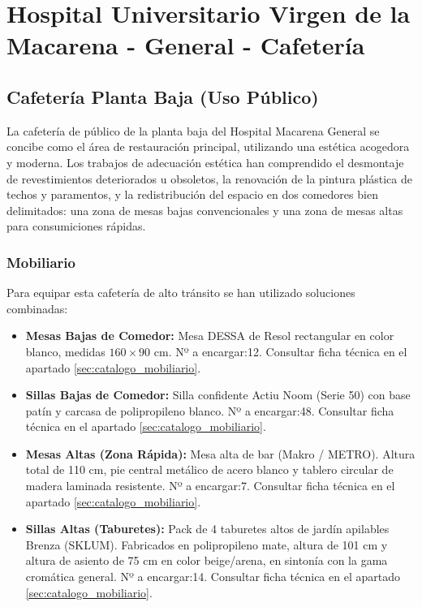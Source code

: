 \documentclass[12pt,a4paper]{article}
\begin{document}
\section{Hospital Universitario Virgen de la Macarena - General - Cafetería}

\subsection{Cafetería Planta Baja (Uso Público)}
La cafetería de público de la planta baja del Hospital Macarena General se concibe como el área de restauración principal, utilizando una estética acogedora y moderna. Los trabajos de adecuación estética han comprendido el desmontaje de revestimientos deteriorados u obsoletos, la renovación de la pintura plástica de techos y paramentos, y la redistribución del espacio en dos comedores bien delimitados: una zona de mesas bajas convencionales y una zona de mesas altas para consumiciones rápidas.

\subsubsection{Mobiliario}
Para equipar esta cafetería de alto tránsito se han utilizado soluciones combinadas:
\begin{itemize}
    \item \textbf{Mesas Bajas de Comedor:} Mesa DESSA de Resol rectangular en color blanco, medidas $160 \times 90$ cm. Nº a encargar:12. Consultar ficha técnica en el apartado \ref{sec:catalogo_mobiliario}.
    \item \textbf{Sillas Bajas de Comedor:} Silla confidente Actiu Noom (Serie 50) con base patín y carcasa de polipropileno blanco. Nº a encargar:48. Consultar ficha técnica en el apartado \ref{sec:catalogo_mobiliario}.
    \item \textbf{Mesas Altas (Zona Rápida):} Mesa alta de bar (Makro / METRO). Altura total de 110 cm, pie central metálico de acero blanco y tablero circular de madera laminada resistente. Nº a encargar:7. Consultar ficha técnica en el apartado \ref{sec:catalogo_mobiliario}.
    \item \textbf{Sillas Altas (Taburetes):} Pack de 4 taburetes altos de jardín apilables Brenza (SKLUM). Fabricados en polipropileno mate, altura de 101 cm y altura de asiento de 75 cm en color beige/arena, en sintonía con la gama cromática general. Nº a encargar:14. Consultar ficha técnica en el apartado \ref{sec:catalogo_mobiliario}.
\end{itemize}
\end{document}
